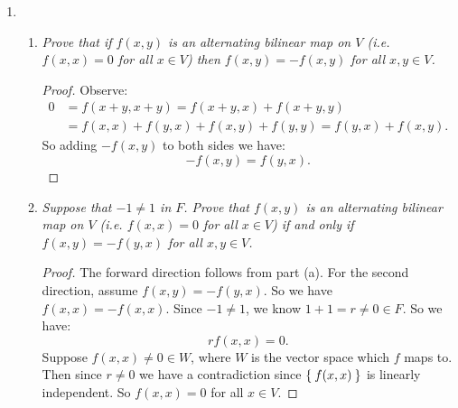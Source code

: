 \documentclass[10pt,oneside,reqno]{amsart}
\theoremstyle{plain}
\theoremstyle{definition}
\theoremstyle{remark}
\newcommand{\mc}{\mathcal}
\newcommand{\bee}{\begin{equation}\begin{aligned}}
\newcommand{\eee}{\end{aligned}\end{equation}}
\newcommand{\tens}{\otimes}
\begin{document}
\begin{enumerate}[label=\arabic*.]
\begin{comment}

\begin{proof}
Recall $T = \mc{T}^k(M) = M \tens \cdots \tens M$. Then we have a basis for $T$ given by: 
$$
B = \Set{m_{i_1} \tens \cdots \tens m_{i_n}: 1 \leq i_j \leq n},
$$
and $m_i = (0,...0,1,0,...,0) \in M$ where the $1$ is in the $i$-th position, the $i$-th standard basis vector of $M$. Recall: 
$$
L = \Lambda^k(M) = \mc{T}^k(M)/\mc{A}^k(M) = T/A.
$$
Now let $\pi:T \to L$ be the natural projection homomorphism given by:
$$\pi(v_1 \tens \cdots \tens v_n) = (v_1 \tens \cdots \tens v_n) \mod A.
$$
Now note that $B/A$ generates $L$. We conjecture that $B/A$ is linearly independent, and thus a basis for $L$. So we know that $B/A$ is just the set where all $i_{j_1} \neq i_{j_2}$ for all $j_1 \neq j_2$. 
 
\end{proof}
\end{comment}

\setcounter{enumi}{11}

\item 
\begin{enumerate}
\item \textit{Prove that if $f(x,y)$ is an alternating bilinear map on $V$ (i.e. $f(x,x) = 0$ for all $x \in V$) then $f(x,y) = -f(x,y)$ for all $x,y \in V$. }

\begin{proof}
Observe: 
\bee
0 &= f(x + y,x + y) = f(x + y,x) + f(x + y,y) \\
&= f(x,x) + f(y,x)  + f(x,y) + f(y,y) = f(y,x) + f(x,y).
\eee
So adding $-f(x,y)$ to both sides we have: 
$$
-f(x,y) = f(y,x).
$$
\end{proof}

\item \textit{Suppose that $-1 \neq 1$ in $F$. Prove that $f(x,y)$ is an alternating bilinear map on $V$ (i.e. $f(x,x) = 0$ for all $x \in V$) if and only if $f(x,y) = -f(y,x)$ for all $x,y \in V$. }

\begin{proof}
The forward direction follows from part (a). For the second direction, assume $f(x,y)  = -f(y,x)$. So we have $f(x,x) = -f(x,x)$. Since $-1 \neq 1$, we know $1 + 1 = r \neq 0 \in F$. So we have: 
$$
rf(x,x) = 0.
$$
Suppose $f(x,x) \neq 0 \in W$, where $W$ is the vector space which $f$ maps to. Then since $r \neq 0$ we have a contradiction since $\Set{f(x,x)}$ is linearly independent. So $f(x,x) = 0$ for all $x \in V$. 
\end{proof}


\end{enumerate}
\end{enumerate}
\end{document}
